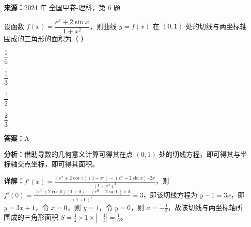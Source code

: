 \begin{question}[points=5]
\textbf{来源：}2024 年 全国甲卷-理科，第 6 题\par
设函数 $f(x)=\dfrac{e^x+2\sin x}{1+x^2}$，则曲线 $y=f(x)$ 在 $(0,1)$ 处的切线与两坐标轴围成的三角形的面积为（   ）
\begin{choices}
  \item $\dfrac{1}{6}$
  \item $\dfrac{1}{3}$
  \item $\dfrac{1}{2}$
  \item $\dfrac{2}{3}$
\end{choices}
\begin{solution}
\textbf{答案：}A

\textbf{分析：}借助导数的几何意义计算可得其在点 $(0,1)$ 处的切线方程，即可得其与坐标轴交点坐标，即可得其面积。

\textbf{详解：}$f'(x)=\frac{(e^x+2\cos x)(1+x^2)-(e^x+2\sin x)\cdot2x}{(1+x^2)^2}$，则 $f'(0)=\frac{(e^0+2\cos0)(1+0)-(e^0+2\sin0)\times0}{(1+0)^2}=3$，即该切线方程为 $y-1=3x$，即 $y=3x+1$，令 $x=0$，则 $y=1$，令 $y=0$，则 $x=-\frac{1}{3}$，故该切线与两坐标轴所围成的三角形面积 $S=\frac{1}{2}\times1\times\left|-\frac{1}{3}\right|=\frac{1}{6}$。
\end{solution}
\end{question}

